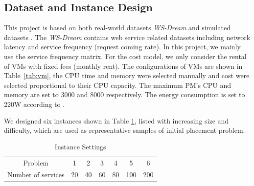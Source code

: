 \subsection{Dataset and Instance Design}
This project is based on both real-world datasets \textit{WS-Dream} \cite{Service_dataset} and simulated datasets \cite{Energy_9}. 
The \textit{WS-Dream} contains web service related datasets including network latency and service frequency (request coming rate). In this project, we mainly use the service frequency matrix. For the cost model, we only consider the rental of VMs with fixed fees (monthly rent). The configurations of VMs are shown in Table~\ref{tab:vm}, the CPU time and memory were selected manually and cost were selected proportional to their CPU capacity. The maximum PM's CPU and memory are set to 3000 and 8000 respectively. The energy consumption is set to 220W according to \cite{Energy_9}.

We designed six instances shown in Table \ref{tab:problem}, listed with increasing size and difficulty, which are used as representative samples of initial placement problem.

\begin{table}[]
\centering
\caption{Instance Settings}
\label{tab:problem}
\begin{tabular}{ccccccc}
\hline 

Problem           & 1  & 2  & 3  & 4  & 5   & 6    \\
Number of services & 20 & 40 & 60 & 80 & 100 & 200 \\ \hline
\end{tabular}
\end{table}

